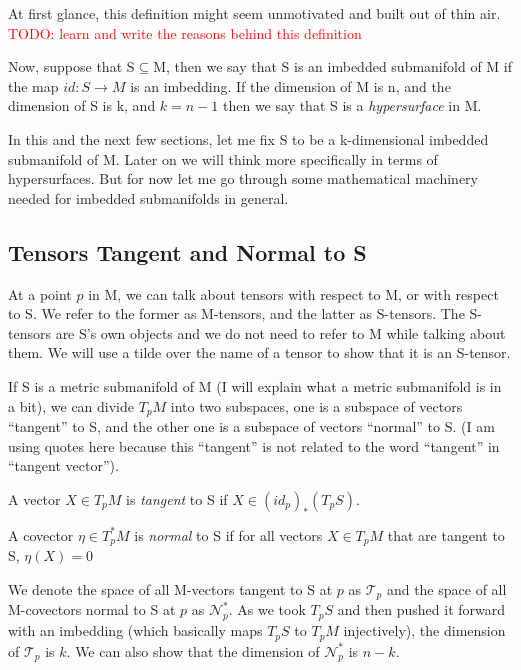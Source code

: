 At first glance, this definition might seem unmotivated and built out of thin air. \textcolor{red}{TODO: learn and write the reasons behind this definition}

Now, suppose that S$\subseteq$M, then we say that S is an imbedded submanifold of M if the map $id:S \longrightarrow M $ is an imbedding. If the dimension of M is n, and the dimension of S is k, and $k=n-1$ then we say that S is a \textit{hypersurface} in M. 


In this and the next few sections, let me fix S to be a k-dimensional imbedded submanifold of M. Later on we will think more specifically in terms of hypersurfaces. But for now let me go through some mathematical machinery needed for imbedded submanifolds in general. 



\subsection{Tensors Tangent and Normal to S}

At a point $ p$ in M, we can talk about tensors with respect to M, or with respect to S. We refer to the former as M-tensors, and the latter as S-tensors. The S-tensors are S's own objects and we do not need to refer to M while talking about them. We will use a tilde over the name of a tensor to show that it is an S-tensor. 

If S is a metric submanifold of M (I will explain what a metric submanifold is in a bit), we can divide $T_pM$ into two subspaces, one is a subspace of vectors ``tangent'' to S, and the other one is a subspace of vectors ``normal'' to S. 
(I am using quotes here because this ``tangent'' is not related to the word ``tangent'' in ``tangent vector''). 

\begin{definition}
    A vector $X\in T_pM$ is \textit{tangent} to S if $X\in (id_p)_*(T_p S)$.
\end{definition}


\begin{definition}
    A covector $\eta \in T^*_pM$ is \textit{normal} to S if for all vectors $X \in T_pM $ that are tangent to S, $\eta(X)=0$
\end{definition}

We denote the space of all M-vectors tangent to S at $p$ as $\mathscr{T}_p$ and the space of all M-covectors normal to S at $p$ as $\mathscr{N}_p^{*}$. As we took $T_pS$ and then pushed it forward with an imbedding (which basically maps $T_pS$ to $T_pM$ injectively), the dimension of $\mathscr{T}_p$ is $k$. We can also show that the dimension of $\mathscr{N}^*_p$ is $n-k$.

